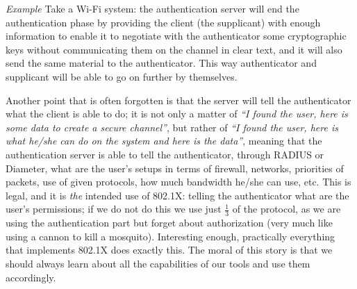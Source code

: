 \vspace{0.5em}

\emph{Example} Take a Wi-Fi system: the authentication server will end the authentication phase by providing the client (the supplicant) with enough information to enable it to negotiate with the authenticator some cryptographic keys without communicating them on the channel in clear text, and it will also send the same material to the authenticator. This way authenticator and supplicant will be able to go on further by themselves.

\vspace{0.5em}

Another point that is often forgotten is that the server will tell the authenticator what the client is able to do; it is not only a matter of \textit{“I found the user, here is some data to create a secure channel”}, but rather of \textit{“I found the user, here is what he/she can do on the system and here is the data”}, meaning that the authentication server is able to tell the authenticator, through RADIUS or Diameter, what are the user's setups in terms of firewall, networks, priorities of packets, use of given protocols, how much bandwidth he/she can use, etc. This is legal, and it is \textit{the} intended use of 802.1X: telling the authenticator what are the user's permissions; if we do not do this we use just $\frac{1}{3}$ of the protocol, as we are using the authentication part but forget about authorization (very much like using a cannon to kill a mosquito). Interesting enough, practically everything that implements 802.1X does exactly this. The moral of this story is that we should always learn about all the capabilities of our tools and use them accordingly.
